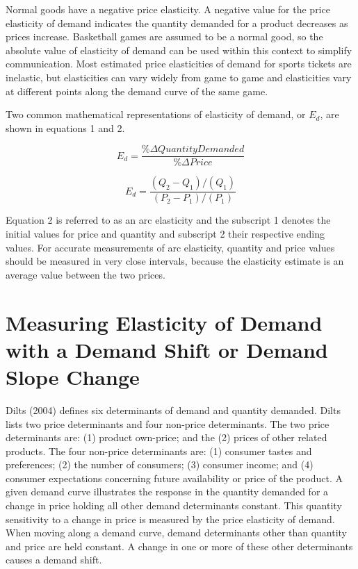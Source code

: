 \documentclass[preprint,12pt,times]{elsarticle}
\begin{document}
Normal goods have a negative price elasticity.  A negative value for the price elasticity of demand indicates the quantity demanded for a product decreases as prices increase.  Basketball games are assumed to be a normal good, so the absolute value of elasticity of demand can be used within this context to simplify communication.  Most estimated price elasticities of demand for sports tickets are inelastic, but elasticities can vary widely from game to game and elasticities vary at different points along the demand curve of the same game.

Two common mathematical representations of elasticity of demand, or $E_d$, are shown in equations 1 and 2.
\begin{large}
\begin{equation}
E_d = \frac{\%\Delta Quantity Demanded}{\%\Delta Price}
\end{equation}
\end{large}
\begin{large}
\begin{equation}
E_d = \frac{(Q_2 - Q_1)/(Q_1)}{(P_2-P_1)/(P_1)}
\end{equation}
\end{large}

Equation 2 is referred to as an arc elasticity and the subscript 1 denotes the initial values for price and quantity and subscript 2 their respective ending values.  For accurate measurements of arc elasticity, quantity and price values should be measured in very close intervals, because the elasticity estimate is an average value between the two prices.

\section{\textbf{Measuring Elasticity of Demand with a Demand Shift or Demand Slope Change}}

Dilts (2004) defines six determinants of demand and quantity demanded.  Dilts lists two price determinants and four non-price determinants.  The two price determinants are: (1) product own-price; and the (2) prices of other related products.  The four non-price determinants are: (1) consumer tastes and preferences; (2) the number of consumers; (3) consumer income; and (4) consumer expectations concerning future availability or price of the product.  A given demand curve illustrates the response in the quantity demanded for a change in price holding all other demand determinants constant.  This quantity sensitivity to a change in price is measured by the price elasticity of demand.  When moving along a demand curve, demand determinants other than quantity and price are held constant.  A change in one or more of these other determinants causes a demand shift.
\end{document}
